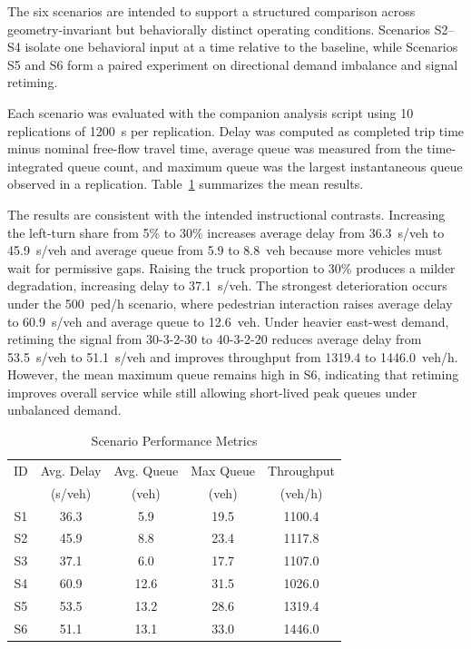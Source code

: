 \documentclass[conference]{IEEEtran}
\begin{document}
The six scenarios are intended to support a structured comparison across geometry-invariant but behaviorally distinct operating conditions. Scenarios S2--S4 isolate one behavioral input at a time relative to the baseline, while Scenarios S5 and S6 form a paired experiment on directional demand imbalance and signal retiming.

Each scenario was evaluated with the companion analysis script using 10 replications of 1200~s per replication. Delay was computed as completed trip time minus nominal free-flow travel time, average queue was measured from the time-integrated queue count, and maximum queue was the largest instantaneous queue observed in a replication. Table~\ref{tab:scenario_metrics} summarizes the mean results.

The results are consistent with the intended instructional contrasts. Increasing the left-turn share from 5\% to 30\% increases average delay from 36.3~s/veh to 45.9~s/veh and average queue from 5.9 to 8.8~veh because more vehicles must wait for permissive gaps. Raising the truck proportion to 30\% produces a milder degradation, increasing delay to 37.1~s/veh. The strongest deterioration occurs under the 500~ped/h scenario, where pedestrian interaction raises average delay to 60.9~s/veh and average queue to 12.6~veh. Under heavier east-west demand, retiming the signal from 30-3-2-30 to 40-3-2-20 reduces average delay from 53.5~s/veh to 51.1~s/veh and improves throughput from 1319.4 to 1446.0~veh/h. However, the mean maximum queue remains high in S6, indicating that retiming improves overall service while still allowing short-lived peak queues under unbalanced demand.

\begin{table}[!t]
\caption{Scenario Performance Metrics}
\label{tab:scenario_metrics}
\centering
\footnotesize
\begin{tabular}{ccccc}
\toprule
ID & Avg. Delay & Avg. Queue & Max Queue & Throughput \\
 & (s/veh) & (veh) & (veh) & (veh/h) \\
\midrule
S1 & 36.3 & 5.9 & 19.5 & 1100.4 \\
S2 & 45.9 & 8.8 & 23.4 & 1117.8 \\
S3 & 37.1 & 6.0 & 17.7 & 1107.0 \\
S4 & 60.9 & 12.6 & 31.5 & 1026.0 \\
S5 & 53.5 & 13.2 & 28.6 & 1319.4 \\
S6 & 51.1 & 13.1 & 33.0 & 1446.0 \\
\bottomrule
\end{tabular}
\end{table}
\end{document}
